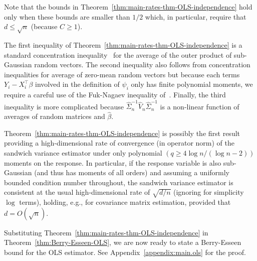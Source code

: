 \documentclass{article}
\begin{document}
 Note that the bounds in Theorem~\ref{thm:main-rates-thm-OLS-independence} hold only when these bounds are smaller than $1/2$ which, in particular, require that $d \le \sqrt{n}$ (because $C \ge 1$). 
 
 The first inequality of Theorem~\ref{thm:main-rates-thm-OLS-independence} is a standard concentration inequality~\citep{koltchinskii2017a} for the average of the outer product of sub-Gaussian random vectors. 
 The second inequality also follows from concentration inequalities for average of zero-mean random vectors but because each terms $Y_i - X_i^{\top}\beta$ involved in the definition of $\psi_i$ only has finite polynomial moments, we require a careful use of the Fuk-Nagaev inequality of~\cite{einmahl2008characterization}. Finally, the third inequality is more complicated because $\widehat{\Sigma}^{-1}_n\widehat{V}_n\widehat{\Sigma}_n^{-1}$ is a non-linear function of averages of random matrices and $\widehat{\beta}$.   
 
 Theorem~\ref{thm:main-rates-thm-OLS-independence} is possibly the first result providing a high-dimensional rate of convergence (in operator norm)  of the sandwich variance estimator under only polynomial $(q\ge4\log n/(\log n - 2))$ moments on the response. 
 In particular, if the response variable is also sub-Gaussian (and thus has moments of all orders) and assuming a uniformly bounded condition number throughout,  the sandwich variance estimator is consistent at the usual high-dimensional rate of $\sqrt{d/n}$ (ignoring for simplicity $\log$ terms), holding, e.g., for covariance matrix estimation, provided that $d = O(\sqrt{n})$. 
 
 
 
 
 
 
 
 
 
 Substituting Theorem~\ref{thm:main-rates-thm-OLS-independence} in Theorem~\ref{thm:Berry-Esseen-OLS}, we are now ready to state a Berry-Esseen bound for the OLS estimator. See Appendix~\ref{appendix:main.ols} for the proof. 
 
\end{document}
